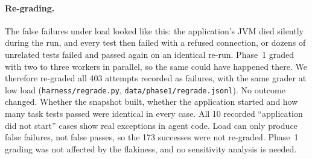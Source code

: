 \documentclass[10pt]{article}
\newcommand{\code}[1]{\texttt{#1}}
\begin{document}
\paragraph{Re-grading.} The false failures under load looked like this: the application's JVM died
silently during the run, and every test then failed with a refused connection, or dozens of
unrelated tests failed and passed again on an identical re-run. Phase~1 graded with two to three
workers in parallel, so the same could have happened there. We therefore re-graded all 403 attempts
recorded as failures, with the same grader at low load (\code{harness/regrade.py},
\code{data/phase1/regrade.jsonl}). No outcome changed. Whether the snapshot built, whether the
application started and how many task tests passed were identical in every case. All 10 recorded
``application did not start'' cases show real exceptions in agent code. Load can only produce false
failures, not false passes, so the 173 successes were not re-graded. Phase~1 grading was not affected
by the flakiness, and no sensitivity analysis is needed.
\end{document}
